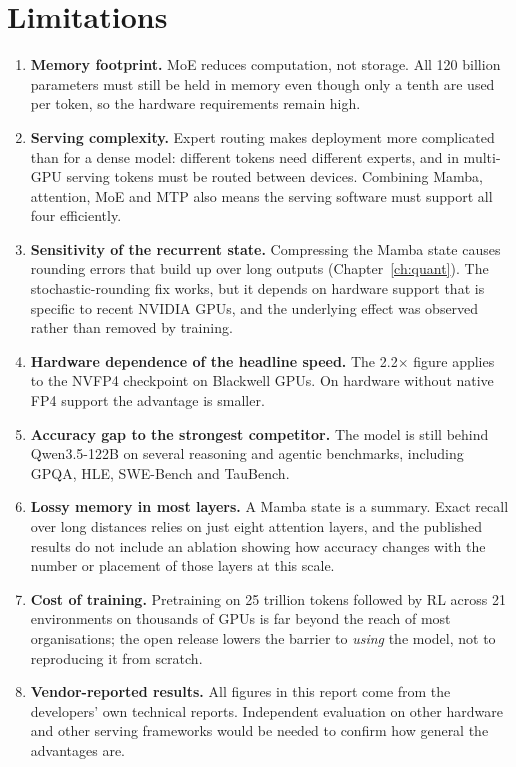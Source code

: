 \section{Limitations}

\begin{enumerate}
  \item \textbf{Memory footprint.} MoE reduces computation, not storage. All
        120 billion parameters must still be held in memory even though only a
        tenth are used per token, so the hardware requirements remain high.
  \item \textbf{Serving complexity.} Expert routing makes deployment more
        complicated than for a dense model: different tokens need different
        experts, and in multi-GPU serving tokens must be routed between
        devices. Combining Mamba, attention, MoE and MTP also means the serving
        software must support all four efficiently.
  \item \textbf{Sensitivity of the recurrent state.} Compressing the Mamba
        state causes rounding errors that build up over long outputs
        (Chapter~\ref{ch:quant}). The stochastic-rounding fix works, but it
        depends on hardware support that is specific to recent NVIDIA GPUs, and
        the underlying effect was observed rather than removed by training.
  \item \textbf{Hardware dependence of the headline speed.} The 2.2$\times$
        figure applies to the NVFP4 checkpoint on Blackwell GPUs. On hardware
        without native FP4 support the advantage is smaller.
  \item \textbf{Accuracy gap to the strongest competitor.} The model is still
        behind Qwen3.5-122B on several reasoning and agentic benchmarks,
        including GPQA, HLE, SWE-Bench and TauBench.
  \item \textbf{Lossy memory in most layers.} A Mamba state is a summary. Exact
        recall over long distances relies on just eight attention layers, and
        the published results do not include an ablation showing how accuracy
        changes with the number or placement of those layers at this scale.
  \item \textbf{Cost of training.} Pretraining on 25 trillion tokens followed
        by RL across 21 environments on thousands of GPUs is far beyond the
        reach of most organisations; the open release lowers the barrier to
        \emph{using} the model, not to reproducing it from scratch.
  \item \textbf{Vendor-reported results.} All figures in this report come from
        the developers' own technical reports. Independent evaluation on other
        hardware and other serving frameworks would be needed to confirm how
        general the advantages are.
\end{enumerate}

